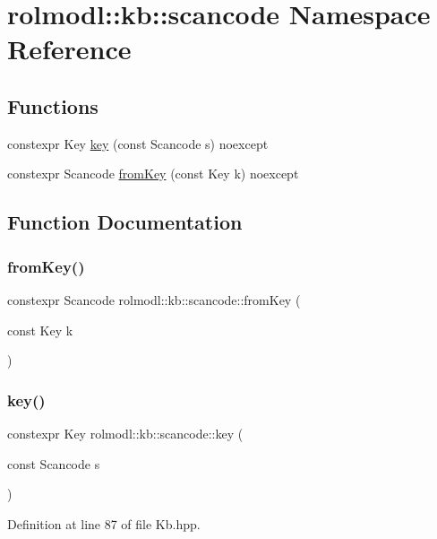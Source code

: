 \hypertarget{namespacerolmodl_1_1kb_1_1scancode}{}\section{rolmodl\+::kb\+::scancode Namespace Reference}
\label{namespacerolmodl_1_1kb_1_1scancode}
\subsection*{Functions}
\begin{DoxyCompactItemize}
\item 
constexpr Key \mbox{\hyperlink{namespacerolmodl_1_1kb_1_1scancode_ae65417e23a168e9e00d5d5e092eb9a0a}{key}} (const Scancode s) noexcept
\item 
constexpr Scancode \mbox{\hyperlink{namespacerolmodl_1_1kb_1_1scancode_aa6d3a694b10f23a0f5319c3a06460439}{from\+Key}} (const Key k) noexcept
\end{DoxyCompactItemize}


\subsection{Function Documentation}
\mbox{\label{namespacerolmodl_1_1kb_1_1scancode_aa6d3a694b10f23a0f5319c3a06460439}} 
\subsubsection{\texorpdfstring{fromKey()}{fromKey()}}
{\footnotesize\ttfamily constexpr Scancode rolmodl\+::kb\+::scancode\+::from\+Key (\begin{DoxyParamCaption}\item[{const Key}]{k }\end{DoxyParamCaption})\hspace{0.3cm}{\ttfamily [noexcept]}}

\mbox{\label{namespacerolmodl_1_1kb_1_1scancode_ae65417e23a168e9e00d5d5e092eb9a0a}} 
\subsubsection{\texorpdfstring{key()}{key()}}
{\footnotesize\ttfamily constexpr Key rolmodl\+::kb\+::scancode\+::key (\begin{DoxyParamCaption}\item[{const Scancode}]{s }\end{DoxyParamCaption})\hspace{0.3cm}{\ttfamily [noexcept]}}



Definition at line 87 of file Kb.\+hpp.

